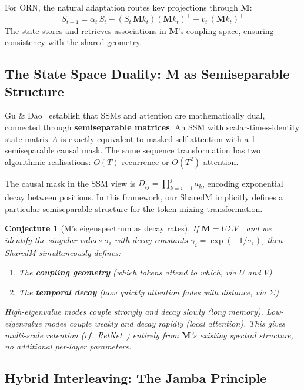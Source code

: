 \documentclass[11pt, a4paper]{article}
\newcommand{\M}{\mathbf{M}}
\theoremstyle{plain}
\newtheorem{conjecture}{Conjecture}
\theoremstyle{remark}
\begin{document}
For ORN, the natural adaptation routes key projections through $\M$:
\begin{equation}
    S_{t+1} = \alpha_t \, S_t - (S_t \, \M k_t)(\M k_t)^\top + v_t \, (\M k_t)^\top
\end{equation}
The state stores and retrieves associations in $\M$'s coupling space, ensuring consistency with the shared geometry.

\subsection{The State Space Duality: M as Semiseparable Structure}

Gu \& Dao~\cite{gu2024mamba2} establish that SSMs and attention are mathematically dual, connected through \textbf{semiseparable matrices}.
An SSM with scalar-times-identity state matrix $A$ is exactly equivalent to masked self-attention with a 1-semiseparable causal mask.
The same sequence transformation has two algorithmic realisations: $O(T)$ recurrence or $O(T^2)$ attention.

The causal mask in the SSM view is $D_{ij} = \prod_{k=i+1}^{j} a_k$, encoding exponential decay between positions.
In this framework, our SharedM implicitly defines a particular semiseparable structure for the token mixing transformation.

\begin{conjecture}[M's eigenspectrum as decay rates]
If $\M = U \Sigma V^\top$ and we identify the singular values $\sigma_i$ with decay constants $\gamma_i = \exp(-1/\sigma_i)$, then SharedM simultaneously defines:
\begin{enumerate}[nosep]
    \item The \textbf{coupling geometry} (which tokens attend to which, via $U$ and $V$)
    \item The \textbf{temporal decay} (how quickly attention fades with distance, via $\Sigma$)
\end{enumerate}
High-eigenvalue modes couple strongly and decay slowly (long memory).
Low-eigenvalue modes couple weakly and decay rapidly (local attention).
This gives multi-scale retention (cf.\ RetNet~\cite{sun2023retnet}) entirely from $\M$'s existing spectral structure, no additional per-layer parameters.
\end{conjecture}

\subsection{Hybrid Interleaving: The Jamba Principle}
\end{document}
